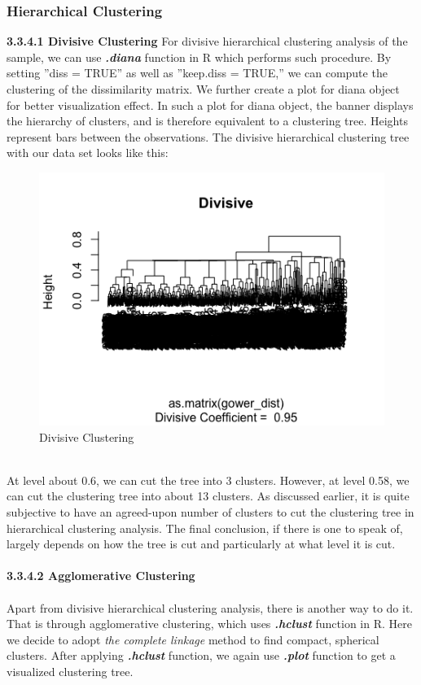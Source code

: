 \documentclass[a4paper,12pt,fleqn]{article}
\begin{document}
\subsubsection{Hierarchical Clustering}
\textbf{3.3.4.1 Divisive Clustering}
For divisive hierarchical clustering analysis of the sample, we can use \textbf{\textit{.diana}} function in R which performs such procedure. By setting ''diss = TRUE'' as well as ''keep.diss = TRUE,'' we  can compute the clustering of the dissimilarity matrix. We further create a plot for diana object for better visualization effect.
\newline
In such a plot for diana object, the banner displays the hierarchy of clusters, and is therefore equivalent to a clustering tree. Heights represent bars between the observations. The divisive hierarchical clustering tree with our data set looks like this:\\
\begin{figure}[h]
	\centering
	\includegraphics[width=0.7\linewidth]{"17.Divisive clustering 2"}
	\caption{Divisive Clustering}
	\label{fig:17}
\end{figure}\\
At level about 0.6, we can cut the tree into 3 clusters. However, at level 0.58, we can cut the clustering tree into about 13 clusters. As discussed earlier, it is quite subjective to have an agreed-upon number of clusters to cut the clustering tree in hierarchical clustering analysis. The final conclusion, if there is one to speak of, largely depends on how the tree is cut and particularly at what level it is cut.\\
\\
\textbf{3.3.4.2 Agglomerative Clustering}\\
\\
Apart from divisive hierarchical clustering analysis, there is another way to do it. That is through agglomerative clustering, which uses \textbf{\textit{.hclust}} function in R. Here we decide to adopt \textit{the complete linkage} method to find compact, spherical clusters. After applying \textbf{\textit{.hclust}} function, we again use \textbf{\textit{.plot}} function to get a visualized clustering tree.\\
\end{document}
